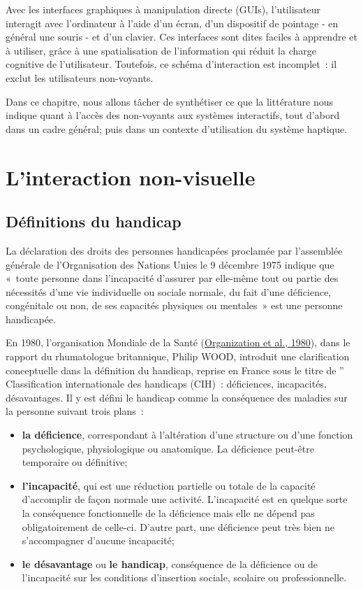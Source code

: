 \documentclass[
]{book}
\begin{document}
Avec les interfaces graphiques à manipulation
directe (GUIs), l'utilisateur interagit avec l'ordinateur à l'aide
d'un écran, d'un dispositif de pointage - en général une souris -
et d'un clavier. Ces interfaces sont dites faciles à apprendre et à
utiliser, grâce à une spatialisation de l'information qui réduit la
charge cognitive de l'utilisateur. Toutefois, ce schéma
d'interaction est incomplet~: il exclut les utilisateurs
non-voyants.

Dans ce chapitre, nous allons tâcher de synthétiser ce que la littérature
nous indique quant à l'accès des non-voyants aux systèmes interactifs, tout
d'abord dans un cadre général; puis dans un contexte d'utilisation du système
haptique.

\hypertarget{linteraction-non-visuelle}{%
\section{L'interaction non-visuelle}\label{linteraction-non-visuelle}}

\hypertarget{duxe9finitions-du-handicap}{%
\subsection{Définitions du handicap}\label{duxe9finitions-du-handicap}}

La déclaration des droits des personnes handicapées proclamée par
l'assemblée générale de l'Organisation des Nations Unies le 9 décembre 1975
indique que «~toute personne dans l'incapacité d'assurer par elle-même tout
ou partie des nécessités d'une vie individuelle ou sociale normale, du fait
d'une déficience, congénitale ou non, de ses capacités physiques ou mentales~»
est une personne handicapée.

En 1980, l'organisation Mondiale de la Santé (\protect\hyperlink{ref-world1980international}{Organization et al., 1980}), dans
le rapport du rhumatologue britannique, Philip WOOD, introduit une
clarification conceptuelle dans la définition du handicap, reprise en France
sous le titre de '' Classification internationale des handicaps (CIH)~:
déficiences, incapacités, désavantages. Il y est défini le handicap comme
la conséquence des maladies sur la personne suivant trois plans~:

\begin{itemize}
\item
  \textbf{la déficience}, correspondant à l'altération
  d'une structure ou d'une fonction psychologique, physiologique ou
  anatomique. La déficience peut-être temporaire ou définitive;
\item
  \textbf{l'incapacité}, qui est une réduction partielle
  ou totale de la capacité d'accomplir de façon normale une activité.
  L'incapacité est en quelque sorte la conséquence fonctionnelle de la
  déficience mais elle ne dépend pas obligatoirement de celle-ci. D'autre
  part, une déficience peut très bien ne s'accompagner d'aucune
  incapacité;
\item
  \textbf{le désavantage} ou \textbf{le handicap},
  conséquence de la déficience ou de l'incapacité sur les conditions
  d'insertion sociale, scolaire ou professionnelle.
\end{itemize}
\end{document}

